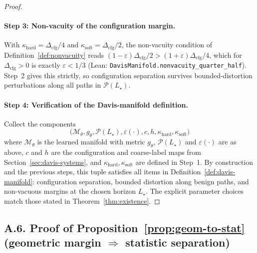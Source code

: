 \documentclass[11pt]{article}
\theoremstyle{remark}
\theoremstyle{plain}
\begin{document}
\begin{proof}
\paragraph{Step 3: Non-vacuity of the configuration margin.}
With $\kappa_{\mathrm{hard}} = \Delta_{\mathrm{cfg}}/4$ and $\kappa_{\mathrm{soft}} = \Delta_{\mathrm{cfg}}/2$, the
non-vacuity condition of Definition~\ref{def:nonvacuity} reads
$(1-\varepsilon)\Delta_{\mathrm{cfg}}/2 > (1+\varepsilon)\Delta_{\mathrm{cfg}}/4$, which for $\Delta_{\mathrm{cfg}}>0$ is
exactly $\varepsilon < 1/3$ (Lean: \texttt{DavisManifold.nonvacuity\_quarter\_half}). Step~2 gives this
strictly, so configuration separation survives bounded-distortion perturbations along all paths in
$\mathcal{P}(L_\star)$.

\paragraph{Step 4: Verification of the Davis-manifold definition.}
Collect the components
\[
\bigl(\mathcal{M}_\theta, g_\theta, \mathcal{P}(L_\star), \varepsilon(\cdot),
c, h, \kappa_{\mathrm{hard}}, \kappa_{\mathrm{soft}}\bigr)
\]
where $\mathcal{M}_\theta$ is the learned manifold with metric $g_\theta$, $\mathcal{P}(L_\star)$ and
$\varepsilon(\cdot)$ are as above, $c$ and $h$ are the configuration and coarse-label maps from
Section~\ref{sec:davis-systems}, and $\kappa_{\mathrm{hard}},\kappa_{\mathrm{soft}}$ are defined in Step~1.
By construction and the previous steps, this tuple satisfies all items in
Definition~\ref{def:davis-manifold}: configuration separation, bounded distortion along benign
paths, and non-vacuous margins at the chosen horizon $L_\star$.  The explicit parameter choices
match those stated in Theorem~\ref{thm:existence}. 
\end{proof}

\medskip

\subsection*{A.6. Proof of Proposition~\ref{prop:geom-to-stat} (geometric margin $\Rightarrow$ statistic separation)}
\end{document}
